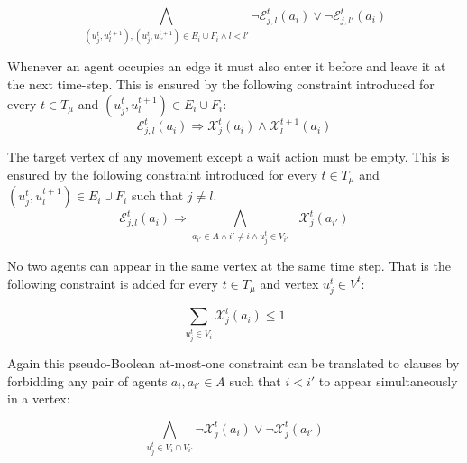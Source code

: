 \documentclass[jair,oneside,11pt]{article}
\begin{document}
\begin{equation}
   {  \bigwedge_{(u^t_j,u^{t+1}_{l}),(u^t_j,u^{t+1}_{l'}) \in E_i \cup F_i \wedge l<l'}{\neg\mathcal{E}^t_{j,{l}}(a_i) \vee \neg\mathcal{E}^t_{j,{l'}}(a_i)}
      }
            \label{eq:basic-3}
\end{equation}
\vspace{0.25cm}

 Whenever an agent occupies an edge it must also enter it before and leave it at the next time-step. This is ensured by the following constraint introduced for every $t \in T_\mu$ and $(u^t_j,u^{t+1}_l) \in E_i \cup F_i$:
\begin{equation}
   {  \mathcal{E}^t_{j,l}(a_i) \Rightarrow \mathcal{X}^t_j(a_i) \wedge \mathcal{X}^{t+1}_l(a_i)
    } \label{eq:basic-4}
\end{equation}
\vspace{0.25cm}

 The target vertex of any movement except a wait action must be empty. This is ensured by the following constraint introduced for every $t \in T_\mu$ and $(u^t_j,u^{t+1}_l) \in E_i \cup F_i$ such that $j \neq l$.
\begin{equation}
   {  \mathcal{E}^t_{j,l}(a_{i}) \Rightarrow \bigwedge_{a_{i'} \in A \wedge {i'} \neq i \wedge u^t_j \in V_{i'}}{\neg \mathcal{X}^t_j(a_{i'})}
    } \label{eq:basic-5}
\end{equation}
\vspace{0.25cm}

 No two agents can appear in the same vertex at the same time step. That is the following constraint is added for every $t \in T_\mu$ and vertex $u^t_j \in V^t$:

\begin{equation}
   {  \sum_{u^t_j \in V_i}{\mathcal{X}^t_j(a_i)} \leq 1
    }\label{eq:basic-6}
\end{equation}

Again this pseudo-Boolean at-most-one constraint can be translated to clauses by forbidding any pair of agents $a_i,a_{i'} \in A$ such that $i < {i'}$ to appear simultaneously in a vertex:

\begin{equation}
   {  \bigwedge_{u^t_j \in V_i\cap V_{i'}}{\neg \mathcal{X}^t_j(a_i) \vee \neg \mathcal{X}^t_j(a_{i'})}
    }\label{eq:basic-7}
\end{equation}
\vspace{0.25cm}
\end{document}
